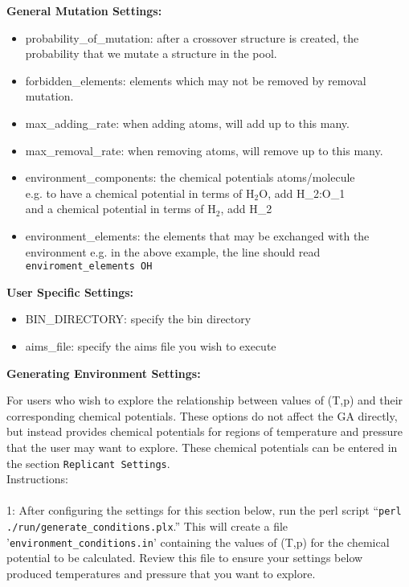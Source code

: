 \textbf{General Mutation Settings:}
\begin{itemize}

\item probability\_of\_mutation: after a crossover structure is created, the probability that we mutate a structure in the pool.

\item forbidden\_elements: elements which may not be removed by removal mutation.

\item max\_adding\_rate: when adding atoms, will add up to this many.

\item max\_removal\_rate: when removing atoms, will remove up to this many.

\item environment\_components: the chemical potentials atoms/molecule\\
e.g. to have a chemical potential in terms of H$_{2}$O, add H\_2:O\_1\\
and a chemical potential in terms of H$_{2}$, add H\_2

\item environment\_elements: the elements that may be exchanged with the environment
e.g. in the above example, the line should read \texttt{enviroment\_elements \hspace{5 mm} O\hspace{5 mm}H}

\end{itemize}

\textbf{User Specific Settings:}

\begin{itemize}

\item BIN\_DIRECTORY: specify the bin directory

\item aims\_file: specify the aims file you wish to execute

\end {itemize}

\textbf{Generating Environment Settings:}

For users who wish to explore the relationship between values of (T,p) and their corresponding chemical potentials. These options do not affect the GA directly, but instead provides chemical potentials for regions of temperature and pressure that the user may want to explore. These chemical potentials can be entered in the section \texttt{Replicant Settings}.\\
Instructions: \\
\\
1: After configuring the settings for this section below, run the perl script ``\texttt{perl ./run/generate\_conditions.plx}.'' This will create a file '\texttt{environment\_conditions.in}' containing the values of (T,p) for the chemical potential to be calculated. Review this file to ensure your settings below produced temperatures and pressure that you want to explore.

